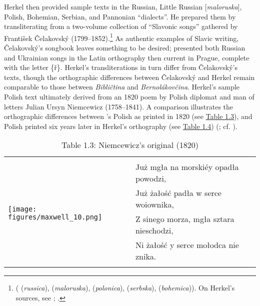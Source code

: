 Herkel then provided sample texts in the Russian, Little Russian [\textit{maloruska}], Polish, Bohemian, Serbian, and Pannonian “dialects”. He prepared them by trans\-literating from a two-volume collection of “Slavonic songs” gathered by František Čelakovský (1799--1852).\footnote{\citeauthor{celakovsky_slowanske_1822} (\citeyear[90--92]{celakovsky_slowanske_1825} (\textit{russica}), \citeyear[112--114]{celakovsky_slowanske_1825} (\textit{maloruska}), \citeyear[150--151]{celakovsky_slowanske_1822} (\textit{polonica}), \citeyear[176]{celakovsky_slowanske_1822} (\textit{serbska}), \citeyear[12--14]{celakovsky_slowanske_1822} (\textit{bohemica})). On Herkel’s sources, see \citet[219]{herkel_jan_2009}; \citet[25--26]{matovcik_prispevok_1964}.} As authentic examples of Slavic writing, Čelakovský’s songbook leaves something to be desired; \citet[90, 113]{celakovsky_slowanske_1825} presented both Russian and Ukrainian songs in the Latin orthography then current in Pra\-gue, complete with the letter \{ř\}. Herkel’s transliterations in turn differ from Čelakovský’s texts, though the orthographic differences between Čelakovský and Herkel remain comparable to those between \textit{Bibličtina} and \textit{Berno\-lákovčina}. Herkel’s sample Polish text ultimately derived from an 1820 poem by Polish diplomat and man of letters Julian Ursyn Niemcewicz (1758--1841). A comparison illustrates the orthographic differences between \citeauthor{niemcewicz_duma_1820}’s Polish as printed in 1820 (see \hyperref[tab:Table 1.3]{Table 1.3}), and Polish printed six years later in Herkel’s orthography (see \hyperref[tab:Table 1.4]{Table 1.4}) (\cite[201]{niemcewicz_duma_1820}; cf. \cite[134]{herkel_elementa_1826}).

\enlargethispage{\baselineskip}

\begin{table}
    \centering
    \small
    \caption*{Table 1.3: Niemcewicz’s original (1820)}
    \label{tab:Table 1.3}
    \begin{tabular}[t]{l l}
        \lsptoprule
        \vspace*{-2.3mm}& \\
        \multirow{5}{*}{\texttt{[image: figures/maxwell\_10.png]}} & Już mgła na morskiéy opadła powodzi,\\
        & Już żałość padła w serce woiownika,\\
        & Z sinego morza, mgła sztara nieschodzi,\\ 
        & Ni żałość y serce mołodca nie znika.\\
        \lspbottomrule
    \end{tabular}
\end{table}

